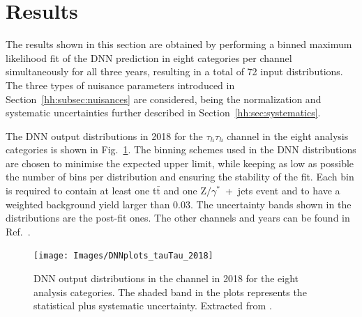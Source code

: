\documentclass[../main.tex]{subfiles}
\begin{document}
\section{Results}
\label{hh:sec:results}

The results shown in this section are obtained by performing a binned maximum likelihood fit of the DNN prediction in eight categories per channel simultaneously for all three years, resulting in a total of 72 input distributions. The three types of nuisance parameters introduced in Section~\ref{hh:subsec:nuisances} are considered, being the normalization and systematic uncertainties further described in Section~\ref{hh:sec:systematics}. 

The DNN output distributions in 2018 for the $\tau_h\tau_h$ channel in the eight analysis categories is shown in Fig.~\ref{hh:fig:dnn_tautau}. The binning schemes used in the DNN distributions are chosen to minimise the expected upper limit, while keeping as low as possible the number of bins per distribution and ensuring the stability of the fit. Each bin is required to contain at least one t$\bar{\text{t}}$ and one Z$/\gamma^*$~+~jets event and to have a weighted background yield larger than 0.03. The uncertainty bands shown in the distributions are the post-fit ones. The other channels and years can be found in Ref.~\cite{hh:results:public_hhbbtt}.

%


\begin{figure}
\begin{center}
\texttt{[image: Images/DNNplots\_tauTau\_2018]}
\end{center}
\caption[DNN output distributions in the \tauh\tauh{} channel in 2018]{DNN output distributions in the \tauh\tauh{} channel in 2018 for the eight analysis categories. The shaded band in the plots represents the statistical plus systematic uncertainty. Extracted from \cite{hh:results:public_hhbbtt}.}
\label{hh:fig:dnn_tautau}
\end{figure}
\end{document}

